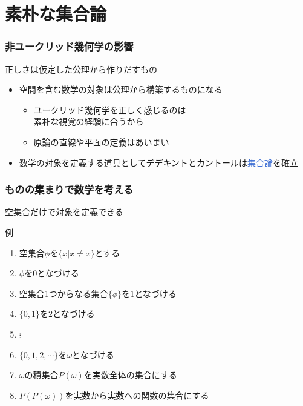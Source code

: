 \documentclass[unicode, 14pt, aspectratio=169]{beamer}
\begin{document}
\section{素朴な集合論}
\begin{frame}
  \frametitle{非ユークリッド幾何学の影響}
  {\large 正しさは仮定した公理から作りだすもの}
  \begin{itemize}
  \item 空間を含む数学の対象は公理から構築するものになる
    \begin{itemize}
    \item ユークリッド幾何学を正しく感じるのは\\素朴な視覚の経験に合うから
    \item 原論の直線や平面の定義はあいまい
    \end{itemize}
  \item 数学の対象を定義する道具としてデデキントとカントールは\textcolor{highlight}{集合論}を確立
  \end{itemize}
\end{frame}
\begin{frame}
  \frametitle{ものの集まりで数学を考える}
  {\large 空集合だけで対象を定義できる}
  \par
  例
  \begin{enumerate}
  \item 空集合$\phi$を$\{x|x\neq x\}$とする
  \item $\phi$を$0$となづける
  \item 空集合1つからなる集合$\{\phi\}$を$1$となづける
  \item $\{0, 1\}$を$2$となづける
  \item $\vdots$
  \item $\{0, 1, 2, \cdots\}$を$\omega$となづける
  \item $\omega$の積集合$P(\omega)$を実数全体の集合にする
  \item $P(P(\omega))$を実数から実数への関数の集合にする
  \end{enumerate}
\end{frame}
\end{document}
